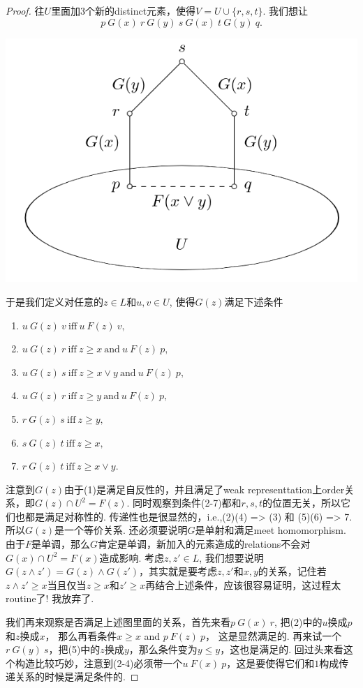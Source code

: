 \documentclass{article}
\begin{document}
\begin{proof}
往$U$里面加3个新的distinct元素，使得$V = U \cup \{r,s,t\}$. 我们想让
$$
p~G(x)~r~G(y)~s~G(x)~t~G(y)~q.
$$
\begin{center}
\includegraphics[scale=0.5]{./images/rel_lattice.png}
\end{center}
于是我们定义对任意的$z \in L$和$u,v \in U$, 使得$G(z)$满足下述条件
\begin{enumerate}
	\item $u~G(z)~v~\text{iff}~u~F(z)~v,$
	\item $u~G(z)~r~\text{iff}~z \geq x ~\text{and}~u~F(z)~p,$
	\item $u~G(z)~s~\text{iff}~z \geq x \vee y ~\text{and}~u~F(z)~p,$
	\item $u~G(z)~r~\text{iff}~z \geq y ~\text{and}~u~F(z)~p,$
	\item $r~G(z)~s~\text{iff}~z \geq y,$
	\item $s~G(z)~t~\text{iff}~z \geq x,$
	\item $r~G(z)~t~\text{iff}~z \geq x \vee y.$
\end{enumerate}
注意到$G(z)$由于(1)是满足自反性的，并且满足了weak representtation上order关系，即$G(z) \cap U^2 = F(z)$. 同时观察到条件(2-7)都和$r,s,t$的位置无关，所以它们也都是满足对称性的. 传递性也是很显然的，i.e.,(2)(4) => (3) 和 (5)(6) => 7. 所以$G(z)$是一个等价关系. 还必须要说明$G$是单射和满足meet homomorphism. 由于$F$是单调，那么$G$肯定是单调，新加入的元素造成的relations不会对$G(x) \cap U^2 = F(x)$造成影响. 考虑$z,z' \in L$, 我们想要说明$G(z \wedge z') = G(z) \wedge G(z')$，其实就是要考虑$z,z'$和$x,y$的关系，记住若$z \wedge z' \geq x$当且仅当$z \geq x$和$z' \geq x$再结合上述条件，应该很容易证明，这过程太routine了! 我放弃了.

我们再来观察是否满足上述图里面的关系，首先来看$p~G(x)~r$, 把(2)中的$u$换成$p$和$z$换成$x$， 那么再看条件$x \geq x$ and $p~F(z)~p$， 这是显然满足的. 再来试一个$r~G(y)~s$，把(5)中的$z$换成$y$，那么条件变为$y \leq y$，这也是满足的. 回过头来看这个构造比较巧妙，注意到(2-4)必须带一个$u~F(x)~p$，这是要使得它们和$1$构成传递关系的时候是满足条件的.
\end{proof}
\end{document}
